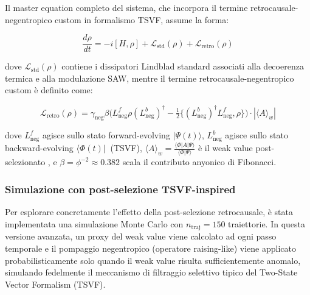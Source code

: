 \documentclass[11pt,a4paper]{article}
\let\oldcite\cite
\renewcommand{\cite}{\protect\oldcite}
\theoremstyle{plain}
\theoremstyle{definition}
\begin{document}
Il master equation completo del sistema, che incorpora il termine retrocausale-negentropico custom in formalismo TSVF, assume la forma:

\begin{equation}
\frac{d\rho}{dt} = -i [H, \rho] + \mathcal{L}_{\text{std}}(\rho) + \mathcal{L}_{\text{retro}}(\rho)
\label{eq:master_full}
\end{equation}

dove \(\mathcal{L}_{\text{std}}(\rho)\) contiene i dissipatori Lindblad standard associati alla decoerenza termica e alla modulazione SAW, mentre il termine retrocausale-negentropico custom è definito come:

\begin{tcolorbox}[colback=blue!5!white, colframe=blue!75!black, title={Termine retrocausale-negentropico custom in formalismo TSVF}]
\begin{equation}
\mathcal{L}_{\text{retro}}(\rho) = \gamma_{\text{neg}} \beta \Big( L_{\text{neg}}^f \rho (L_{\text{neg}}^b)^\dagger 
- \tfrac{1}{2} \big\{ (L_{\text{neg}}^b)^\dagger L_{\text{neg}}^f , \rho \big\} \Big) \cdot |\langle A \rangle_w|
\label{eq:retro_tsvf}
\end{equation}

dove $L_{\text{neg}}^f$ agisce sullo stato forward-evolving $|\Psi(t)\rangle$, $L_{\text{neg}}^b$ agisce sullo stato backward-evolving $\langle\Phi(t)|\ $ (TSVF), $\langle A \rangle_w = \frac{\langle \Phi | A | \Psi \rangle}{\langle \Phi | \Psi \rangle}$ è il weak value post-selezionato \cite{Aharonov2008}, e $\beta = \phi^{-2} \approx 0.382$ scala il contributo anyonico di Fibonacci.
\end{tcolorbox}








\subsubsection{Simulazione con post-selezione TSVF-inspired}


\vspace{0.2cm}

Per esplorare concretamente l’effetto della post-selezione retrocausale, è stata implementata una simulazione Monte Carlo con \(n_{\text{traj}} = 150\) traiettorie. In questa versione avanzata, un proxy del weak value viene calcolato ad ogni passo temporale e il pompaggio negentropico (operatore raising-like) viene applicato probabilisticamente solo quando il weak value risulta sufficientemente anomalo, simulando fedelmente il meccanismo di filtraggio selettivo tipico del Two-State Vector Formalism (TSVF).
\end{document}
